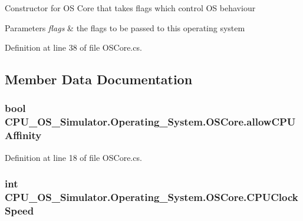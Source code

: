 Constructor for O\+S Core that takes flags which control O\+S behaviour 


\begin{DoxyParams}{Parameters}
{\em flags} & the flags to be passed to this operating system\\
\hline
\end{DoxyParams}


Definition at line 38 of file O\+S\+Core.\+cs.



\subsection{Member Data Documentation}
\hypertarget{class_c_p_u___o_s___simulator_1_1_operating___system_1_1_o_s_core_ad3fc35d621bf2c2afc8b2a66fc38d2c0}{}
\subsubsection[{allow\+C\+P\+U\+Affinity}]{\setlength{\rightskip}{0pt plus 5cm}bool C\+P\+U\+\_\+\+O\+S\+\_\+\+Simulator.\+Operating\+\_\+\+System.\+O\+S\+Core.\+allow\+C\+P\+U\+Affinity\hspace{0.3cm}{\ttfamily [private]}}\label{class_c_p_u___o_s___simulator_1_1_operating___system_1_1_o_s_core_ad3fc35d621bf2c2afc8b2a66fc38d2c0}


Definition at line 18 of file O\+S\+Core.\+cs.

\hypertarget{class_c_p_u___o_s___simulator_1_1_operating___system_1_1_o_s_core_a99f66d92928cea0a61e21ea427f16ab2}{}
\subsubsection[{C\+P\+U\+Clock\+Speed}]{\setlength{\rightskip}{0pt plus 5cm}int C\+P\+U\+\_\+\+O\+S\+\_\+\+Simulator.\+Operating\+\_\+\+System.\+O\+S\+Core.\+C\+P\+U\+Clock\+Speed\hspace{0.3cm}{\ttfamily [private]}}\label{class_c_p_u___o_s___simulator_1_1_operating___system_1_1_o_s_core_a99f66d92928cea0a61e21ea427f16ab2}


